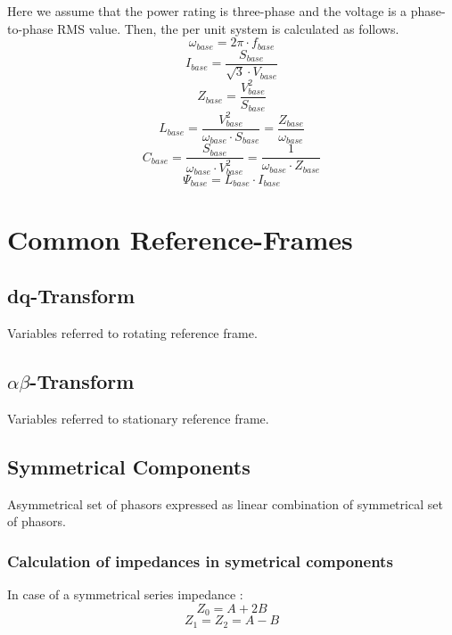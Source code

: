 Here we assume that the power rating is three-phase and the voltage is a phase-to-phase RMS value. Then, the per unit system is calculated as follows. 
\begin{equation}
    \omega_{base} = 2\pi \cdot f_{base}
\end{equation}
\begin{equation}
    I_{base} = \frac{S_{base}}{\sqrt{3} \cdot V_{base}}
\end{equation}
\begin{equation}
    Z_{base} = \frac{V_{base}^2}{S_{base}}
\end{equation}
\begin{equation}
    L_{base} = \frac{V_{base}^2}{\omega_{base} \cdot S_{base}} = \frac{Z_{base}}{\omega_{base}} 
\end{equation}
\begin{equation}
    C_{base} = \frac{S_{base}}{\omega_{base} \cdot V_{base}^2} = \frac{1}{\omega_{base} \cdot Z_{base}} 
\end{equation}
\begin{equation}
    \Psi_{base} = L_{base} \cdot I_{base}
\end{equation}

\section{Common Reference-Frames}
\subsection{dq-Transform}
Variables referred to rotating reference frame.
\subsection{$\alpha\beta$-Transform}
Variables referred to stationary reference frame.
\subsection{Symmetrical Components}
Asymmetrical set of phasors expressed as linear combination of symmetrical set of phasors.  

\subsubsection{Calculation of impedances in symetrical components}
In case of a symmetrical series impedance :
\begin{equation}
    Z_{0} = A + 2B
\end{equation}
\begin{equation}
    Z_{1} = Z_{2} = A - B
\end{equation}

